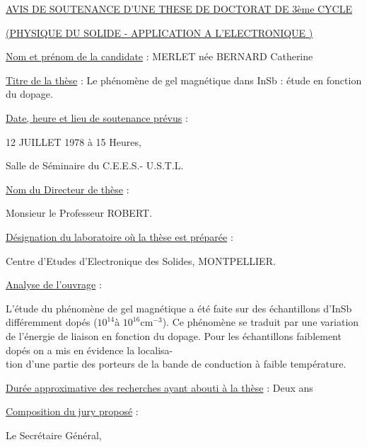 \begin{center}
\uline{AVIS DE SOUTENANCE D'UNE THESE DE DOCTORAT DE 3ème CYCLE}

\uline{(PHYSIQUE DU SOLIDE - APPLICATION A L'ELECTRONIQUE )}
\end{center}

\uline{Nom et prénom de la candidate} : MERLET née BERNARD Catherine

\uline{Titre de la thèse} : Le phénomène de gel magnétique dans InSb : étude en fonction
du dopage.

\uline{Date, heure et lieu de soutenance prévus} :

12 JUILLET 1978 à 15 Heures,

Salle de Séminaire du C.E.E.S.- U.S.T.L.

\uline{Nom du Directeur de thèse} :

Monsieur le Professeur ROBERT.

\uline{Désignation du laboratoire où la thèse est préparée} :

Centre d'Etudes d'Electronique des Solides, MONTPELLIER.

\uline{Analyse de l'ouvrage} :

L'étude du phénomène de gel magnétique a été
faite sur des échantillons d'InSb différemment dopés (\(10^{14}\)à \(10^{16}\mathrm{cm}^{-3}\)). Ce
phénomène se traduit par une variation de l'énergie de liaison en fonction du
dopage. Pour les échantillons faiblement dopés on a mis en évidence la localisa-\\
tion d'une partie des porteurs de la bande de conduction à faible température.

\uline{Durée approximative des recherches ayant abouti à la thèse} : Deux ans

\uline{Composition du jury proposé} :


Le Secrétaire Général,


